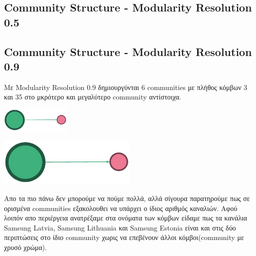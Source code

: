 \documentclass[12pt]{article}
\begin{document}
	
	
	
	
	
	
	
	
	
	
	
	
	
	
	
	
	
	
	
	
	
	
	
	
	
	
	
	
	
	
		
	\newpage
	\subsection{Community Structure - Modularity Resolution 0.5}
	
	
	
	
	
	
	\newpage
	\subsection{Community Structure - Modularity Resolution 0.9}
	Με Modularity Resolution 0.9 δημιουργύνται 6 communities με πλήθος κόμβων 3 και 35 στο μκρότερο και μεγαλύτερο community αντίστοιχα.
	\begin{center}
		\begin{adjustbox}{valign=t}
			\includegraphics[width=0.25\textwidth]{photos-files/section4/ate.JPG}
		\end{adjustbox}
		\hfill
		\begin{adjustbox}{valign=t}
			\includegraphics[width=0.5\textwidth]{photos-files/section4/ate.JPG}
		\end{adjustbox}
	\end{center}
	
	Απο τα πιο πάνω δεν μπορούμε να πούμε πολλά, αλλά σίγουρα παρατηρούμε πως σε ορισμένα communities εξακολουθει να υπάρχει ο ίδιος αριθμός καναλιών. Αφού λοιπόν απο περιέργεια ανατρέξαμε στα ονόματα των κόμβων είδαμε πως τα κανάλια Samsung Latvia, Samsung Lithuania και Samsung Estonia είναι και στις δύο περιπτώσεις στο ίδιο community χωρις να επεβένουν άλλοι κόμβοι(community με χρυσό χρώμα).
	
\end{document}
